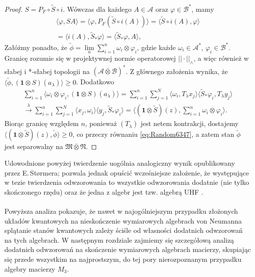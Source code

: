 \begin{proof}
$S = P_{F} \circ \tilde{S} \circ i$.
Wówczas dla każdego $A \in \mathcal{A}$ oraz $\varphi \in \mathcal{B}^{*}$,
mamy
\begin{eqnarray}
\langle \varphi, SA \rangle =
\langle \varphi, P_{F} ( \tilde{S} \circ i (A)) \rangle =
\langle  \tilde{S} \circ i (A), \varphi \rangle \nonumber\\
=\langle i(A), \tilde{S}_{*} \varphi \rangle =
\langle \tilde{S}_{*} \varphi, A \rangle,
\end{eqnarray}
Załóżmy ponadto, że
$\tilde{\phi} = \lim \limits_{n} \sum_{i=1}^{n}\omega_{i} \otimes \varphi_{i}$,
gdzie każde $\omega_{i} \in \mathcal{A}^{*}$,
$\varphi_{i} \in \mathcal{B}^{*}$.
Granicę rozumie się w projektywnej normie operatorowej $|| \cdot ||_{\wedge}$,
a więc również w słabej i *-słabej topologii na
$(\mathcal{A} \bar{\otimes} \mathcal{B})^{*}$.
Z głównego założenia wynika, że
$\langle \tilde{\phi},(\mathbf{1} \otimes S) (a_{\lambda}) \rangle \geq 0$. Dodatkowo
\begin{eqnarray}
\sum \limits_{i=1}^{n}\langle \omega_{i} \otimes \varphi_{i},
(\mathbf{1} \otimes S)(a_{\lambda}) \rangle =
\sum \limits_{i=1}^{n} \sum \limits_{j=1}^{N}
\langle \omega_{i} , T_{\lambda} x_{j} \rangle
\langle \tilde{S}_{*} \varphi_{i}, T_{\lambda} y_{j}\rangle \nonumber\\
\stackrel{\lambda}{\longrightarrow}\sum \limits_{i=1}^{n} \sum \limits_{j=1}^{N}
\langle  x_{j}, \omega_{i} \rangle\langle  y_{j},  \tilde{S}_{*} \varphi_{i} \rangle =
\langle (\mathbf{1} \otimes \tilde{S})(z),
\sum \limits_{i=1}^{n} \omega_{i} \otimes \varphi_{i} \rangle .
\end{eqnarray}
Biorąc granicę względem $n$,
ponieważ $(T_{\lambda})$ jest netem kontrakcji, dostajemy
$\langle (\mathbf{1} \otimes \tilde{S}) (z) ,
\tilde{\phi}\rangle \geq 0$,
co przeczy równaniu \eqref{eq:Random6347},
a zatem stan $\tilde{\phi}$ jest separowalny na
$\mathfrak{M} \bar{\otimes} \mathfrak{N}$.
\end{proof}

Udowodnione powyżej twierdzenie uogólnia analogiczny wynik opublikowany przez
E.\,St{\o}rmera; pozwala jednak opuścić wcześniejsze założenie, że występujące
w tezie twierdzenia odwzorowania to wszystkie odwzorowania dodatnie
(nie tylko skończonego rzędu) oraz że jedna z algebr jest tzw. algebrą
UHF \cite{stormer2009separable}.

\paragraph{}
Powyższa analiza pokazuje, że nawet w najogólniejszym przypadku złożonych
układów kwantowych na nieskończenie wymiarowych algebrach von Neumanna
splątanie stanów kwantowych zależy ściśle od własności dodatnich odwzorowań
na tych algebrach.
W następnym rozdziale zajmiemy się szczegółową analizą dodatnich odwzorowań
na skończenie wymiarowych algebrach macierzy, skupiając się przede wszystkim
na najprostszym, do tej pory nierozpoznanym przypadku algebry macierzy
$M_{3}$.
